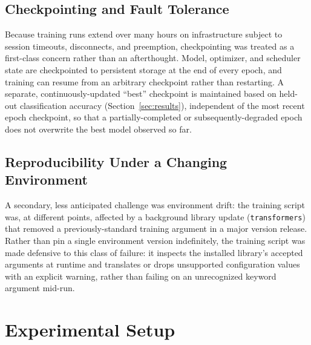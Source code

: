 \documentclass[acmsmall,review=false]{acmart}
\begin{document}
\subsection{Checkpointing and Fault Tolerance}

Because training runs extend over many hours on infrastructure subject to
session timeouts, disconnects, and preemption, checkpointing was treated as a
first-class concern rather than an afterthought. Model, optimizer, and
scheduler state are checkpointed to persistent storage at the end of every
epoch, and training can resume from an arbitrary checkpoint rather than
restarting. A separate, continuously-updated ``best'' checkpoint is maintained
based on held-out classification accuracy (Section~\ref{sec:results}),
independent of the most recent epoch checkpoint, so that a partially-completed
or subsequently-degraded epoch does not overwrite the best model observed so
far.

\subsection{Reproducibility Under a Changing Environment}

A secondary, less anticipated challenge was environment drift: the training
script was, at different points, affected by a background library update
(\texttt{transformers}) that removed a previously-standard training argument
in a major version release. Rather than pin a single environment version
indefinitely, the training script was made defensive to this class of failure:
it inspects the installed library's accepted arguments at runtime and
translates or drops unsupported configuration values with an explicit warning,
rather than failing on an unrecognized keyword argument mid-run.

\section{Experimental Setup}
\label{sec:setup}
\end{document}
